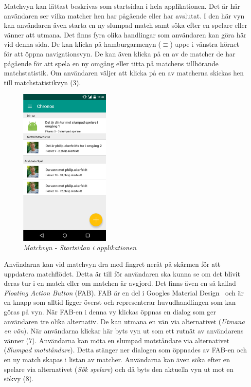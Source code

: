 \documentclass[a4paper, 11pt]{article}
\begin{document}
Matchvyn kan lättast beskrivas som startsidan i hela applikationen. Det är här användaren ser vilka matcher hen har pågående eller har avslutat. I den här vyn kan användaren även starta en ny slumpad match samt söka efter en spelare eller vänner att utmana. 
Det finns fyra olika handlingar som användaren kan göra här vid denna sida. De kan klicka på hamburgarmenyn ($\equiv$) uppe i vänstra hörnet för att öppna navigationsvyn. De kan även klicka på en av de matcher de har pågående för att spela en ny omgång eller titta på matchens tillhörande matchstatistik. Om användaren väljer att klicka på en av matcherna skickas hen till matchstatistikvyn (3).
\begin{figure}[H]
\begin{center}
	\includegraphics[width=0.4\textwidth]{app_matches} 
	\caption{\textit{Matchvyn - Startsidan i applikationen}}
	\end{center}
\end{figure}
\pagebreak

Användarna kan vid matchvyn dra med fingret neråt på skärmen för att uppdatera matchflödet. Detta är till för användaren ska kunna se om det blivit deras tur i en match eller om matchen är avgjord. Det finns även en så kallad \textit{Floating Action Button} (FAB). FAB är en del i Googles Material Design~\cite{MaterialDesign} och är en knapp som alltid ligger överst och representerar huvudhandlingen som kan göras på vyn. När FAB-en i denna vy klickas öppnas en dialog som ger användaren tre olika alternativ. De kan utmana en vän via alternativet (\textit{Utmana en vän}). När användarna klickar här byts vyn ut som ett rutnät av användarens vänner (7). 
Användarna kan möta en slumpad motståndare via alternativet (\textit{Slumpad motståndare}). Detta stänger ner dialogen som öppnades av FAB-en och en ny match skapas i listan av matcher. Användarna kan även söka efter en spelare via alternativet (\textit{Sök spelare}) och då byts den aktuella vyn ut mot en sökvy (8). 
\end{document}
